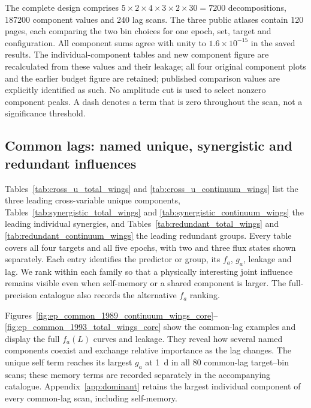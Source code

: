 \documentclass[fleqn,usenatbib]{mnras}
\begin{document}
The complete design comprises $5\times2\times4\times3\times2\times30=7200$ decompositions, 187200 component values and 240 lag scans. The three public atlases contain 120 pages, each comparing the two bin choices for one epoch, set, target and configuration. All component sums agree with unity to $1.6\times10^{-15}$ in the saved results. The individual-component tables and new component figure are recalculated from these values and their leakage; all four original component plots and the earlier budget figure are retained; published comparison values are explicitly identified as such. No amplitude cut is used to select nonzero component peaks. A dash denotes a term that is zero throughout the scan, not a significance threshold.


\subsection{Common lags: named unique, synergistic and redundant influences}
\label{sec:common}
Tables~\ref{tab:cross_u_total_wings} and \ref{tab:cross_u_continuum_wings} list the three leading cross-variable unique components, Tables~\ref{tab:synergistic_total_wings} and \ref{tab:synergistic_continuum_wings} the leading individual synergies, and Tables~\ref{tab:redundant_total_wings} and \ref{tab:redundant_continuum_wings} the leading redundant groups. Every table covers all four targets and all five epochs, with two and three flux states shown separately. Each entry identifies the predictor or group, its $f_a$, $g_a$, leakage and lag. We rank within each family so that a physically interesting joint influence remains visible even when self-memory or a shared component is larger. The full-precision catalogue also records the alternative $f_a$ ranking.

Figures~\ref{fig:ep_common_1989_continuum_wings_core}--\ref{fig:ep_common_1993_total_wings_core} show the common-lag examples and display the full $f_a(L)$ curves and leakage. They reveal how several named components coexist and exchange relative importance as the lag changes. The unique self term reaches its largest $g_a$ at 1~d in all 80 common-lag target--bin scans; these memory terms are recorded separately in the accompanying catalogue. Appendix~\ref{app:dominant} retains the largest individual component of every common-lag scan, including self-memory.
\end{document}
